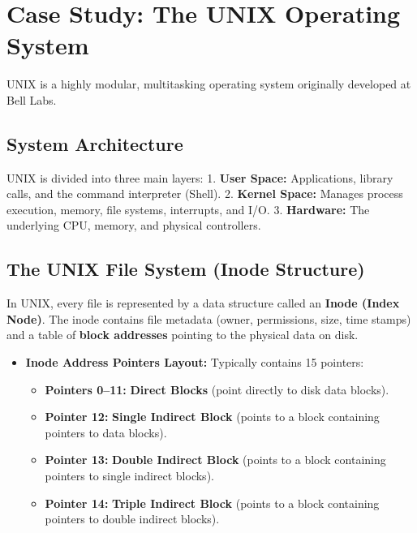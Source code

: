 \documentclass[12pt,a4paper]{article}
\begin{document}
\section{Case Study: The UNIX Operating System}

UNIX is a highly modular, multitasking operating system originally developed at Bell Labs.

\subsection{System Architecture}
UNIX is divided into three main layers:
1. \textbf{User Space:} Applications, library calls, and the command interpreter (Shell).
2. \textbf{Kernel Space:} Manages process execution, memory, file systems, interrupts, and I/O.
3. \textbf{Hardware:} The underlying CPU, memory, and physical controllers.

\subsection{The UNIX File System (Inode Structure)}
In UNIX, every file is represented by a data structure called an \textbf{Inode (Index Node)}. The inode contains file metadata (owner, permissions, size, time stamps) and a table of \textbf{block addresses} pointing to the physical data on disk.

\begin{itemize}[leftmargin=*, itemsep=3pt]
  \item \textbf{Inode Address Pointers Layout:} Typically contains 15 pointers:
  \begin{itemize}[leftmargin=*, itemsep=2.5pt, topsep=0pt]
    \item \textbf{Pointers 0–11:} \textbf{Direct Blocks} (point directly to disk data blocks).
    \item \textbf{Pointer 12:} \textbf{Single Indirect Block} (points to a block containing pointers to data blocks).
    \item \textbf{Pointer 13:} \textbf{Double Indirect Block} (points to a block containing pointers to single indirect blocks).
    \item \textbf{Pointer 14:} \textbf{Triple Indirect Block} (points to a block containing pointers to double indirect blocks).
    \end{itemize}
  \end{itemize}
\end{document}
